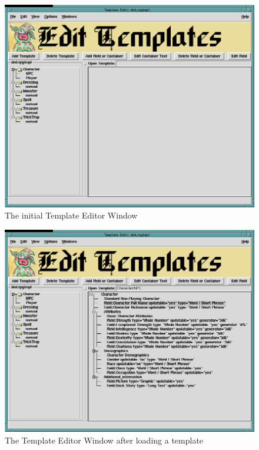 \begin{figure}[hbpt]
\begin{centering}
\includegraphics[width=5in]{TemplateEditor1.png}
\caption{The initial Template Editor Window}
\label{fig:tmped1}
\end{centering}
\end{figure}
\begin{figure}[hbpt]
\begin{centering}
\includegraphics[width=5in]{TemplateEditor2.png}
\caption{The Template Editor Window after loading a template}
\label{fig:tmped2}
\end{centering}
\end{figure}
